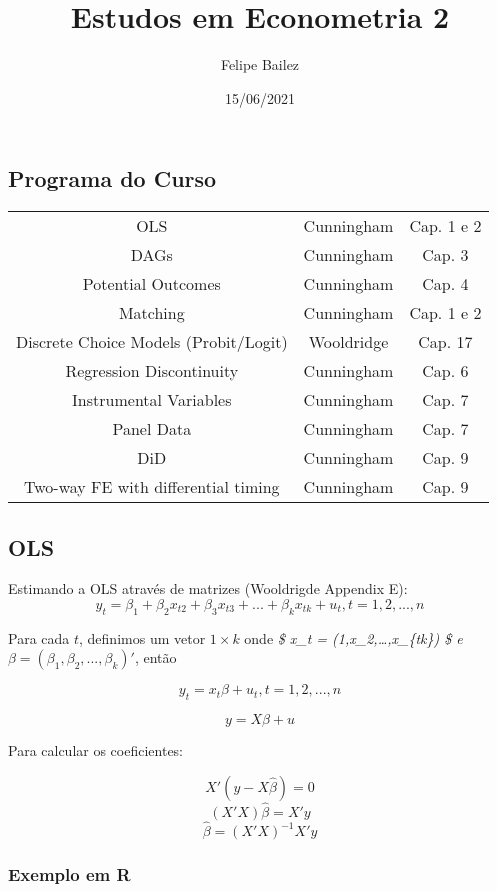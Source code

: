 \documentclass[
]{article}
\title{Estudos em Econometria 2}
\author{Felipe Bailez}
\date{15/06/2021}
\begin{document}
\maketitle

\hypertarget{programa-do-curso}{%
\subsection{Programa do Curso}\label{programa-do-curso}}

\begin{tabular}{ |c|c|c| } 
 \hline
OLS & Cunningham & Cap. 1 e 2\\ 
DAGs & Cunningham & Cap. 3\\ 
Potential Outcomes & Cunningham & Cap. 4\\
Matching & Cunningham & Cap. 1 e 2\\
Discrete Choice Models (Probit/Logit) & Wooldridge & Cap. 17\\ 
Regression Discontinuity & Cunningham & Cap. 6\\
Instrumental Variables & Cunningham & Cap. 7\\
Panel Data & Cunningham & Cap. 7\\
DiD & Cunningham & Cap. 9\\
Two-way FE with differential timing & Cunningham & Cap. 9\\ 
 \hline

\end{tabular}
\newpage

\hypertarget{ols}{%
\subsection{OLS}\label{ols}}

Estimando a OLS através de matrizes (Wooldrigde Appendix E):
\emph{\[ y_t = \beta_1 + \beta_2 x_{t2} + \beta_3 x_{t3} + ... + \beta_k x_{tk} + u_t 
, t = 1,2,...,n\]}

Para cada \(t\), definimos um vetor \(1 \times k\) onde \emph{\$ x\_t =
(1,x\_2,\ldots,x\_\{tk\}) \$ e
\(\beta = (\beta_1, \beta_2, ..., \beta_k)'\)}, então

\[ y_t =  x_t \beta + u_t , t = 1,2, ... , n\]

\[ y = X \beta + u \]

Para calcular os coeficientes:

\[ X'(y - X \hat{\beta} )= 0\] \[ (X'X)\hat{\beta} = X'y \]
\[ \hat{\beta} = (X'X)^{-1} X'y \]

\hypertarget{exemplo-em-r}{%
\subsubsection{Exemplo em R}\label{exemplo-em-r}}
\end{document}
